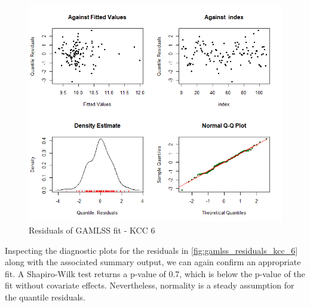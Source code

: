 \begin{figure}[H]
\centering
  \includegraphics[width=0.95\linewidth]{figures/gamlss_residuals_kcc_6.png}
  \caption{Residuals of GAMLSS fit - KCC 6}
  \label{fig:gamlss_residuals_kcc_6}
\end{figure}





Inspecting the diagnostic plots for the residuals in \autoref{fig:gamlss_residuals_kcc_6} along with the associated summary output, we can again confirm an appropriate fit. A Shapiro-Wilk test returns a p-value of 0.7, which is below the p-value of the fit without covariate effects. Nevertheless, normality is a steady assumption for the quantile residuals.













